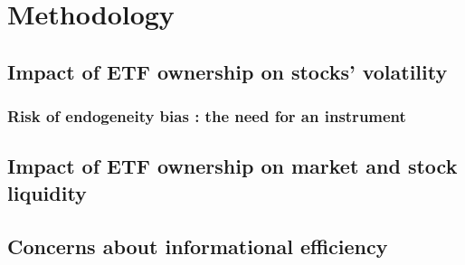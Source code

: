 \section{Methodology}
\subsection{Impact of ETF ownership on stocks' volatility}
\subsubsection{Risk of endogeneity bias : the need for an instrument}
\subsection{Impact of ETF ownership on market and stock liquidity}

\subsection{Concerns about informational efficiency}
